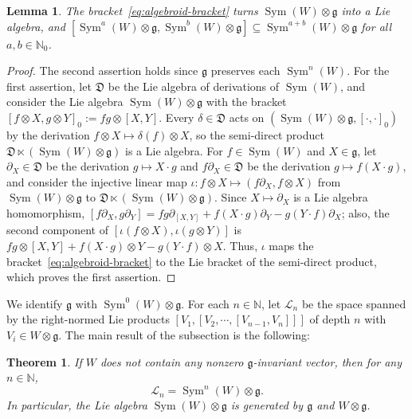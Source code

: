 \documentclass{article}
\newcommand{\N}{\mathbb{N}}
\newcommand{\frakg}{\mathfrak{g}}
\newcommand{\cL}{\mathcal{L}}
\newcommand{\Sym}{\operatorname{Sym}}
\newtheorem{theorem}{Theorem}
\newtheorem{lemma}{Lemma}
\theoremstyle{definition}
\theoremstyle{plain}
\begin{document}
\begin{lemma}\label{lem:algebroid-lie}
The bracket~\eqref{eq:algebroid-bracket} turns $\Sym(W)\otimes\frakg$ into a Lie algebra,
    and $[\Sym^a(W)\otimes \frakg,\Sym^b(W)\otimes \frakg]\subseteq \Sym^{a+b}(W)\otimes \frakg$ for all $a,b\in\N_0$.
\end{lemma}

\begin{proof}
The second assertion holds since $\frakg$ preserves each $\Sym^n(W)$.
For the first assertion, let $\mathfrak D$ be the Lie algebra of derivations of $\Sym(W)$, and consider the Lie algebra $\Sym(W)\otimes\frakg$ with the bracket $[f\otimes X,g\otimes Y]_0:=fg\otimes[X,Y]$.
Every $\delta\in\mathfrak D$ acts on $(\Sym(W)\otimes\frakg,[\cdot,\cdot]_0)$ by the derivation $f\otimes X\mapsto\delta(f)\otimes X$, so the semi-direct product $\mathfrak D\ltimes(\Sym(W)\otimes\frakg)$ is a Lie algebra.
For $f\in\Sym(W)$ and $X\in\frakg$, let $\partial_X\in\mathfrak D$ be the derivation $g\mapsto X\cdot g$ and $f\partial_X\in\mathfrak D$ be the derivation $g\mapsto f(X\cdot g)$,
    and consider the injective linear map $\iota\colon f\otimes X\mapsto(f\partial_X,f\otimes X)$ from $\Sym(W)\otimes\frakg$ to $\mathfrak D\ltimes(\Sym(W)\otimes\frakg)$.
Since $X\mapsto\partial_X$ is a Lie algebra homomorphism, $[f\partial_X,g\partial_Y]=fg\partial_{[X,Y]}+f(X\cdot g)\partial_Y-g(Y\cdot f)\partial_X$; also, the second component of $[\iota(f\otimes X),\iota(g\otimes Y)]$ is $fg\otimes[X,Y]+f(X\cdot g)\otimes Y-g(Y\cdot f)\otimes X$.
Thus, $\iota$ maps the bracket~\eqref{eq:algebroid-bracket} to the Lie bracket of the semi-direct product, which proves the first assertion.
\end{proof}

We identify $\frakg$ with $\Sym^0(W)\otimes\frakg$.
For each $n\in\N$, let $\cL_n$ be the space spanned by the right-normed Lie products $[V_1,[V_2,\cdots,[V_{n-1},V_n]]]$ of depth $n$ with $V_i\in W\otimes\frakg$.
The main result of the subsection is the following:


\begin{theorem}\label{thm:udg}
If $W$ does not contain any nonzero $\frakg$-invariant vector, then for any $n\in\N$,
$$ \cL_n=\Sym^n(W)\otimes\frakg.
$$
In particular, the Lie algebra $\Sym(W)\otimes\frakg$ is generated by $\frakg$ and $W\otimes\frakg$.
\end{theorem}
\end{document}
